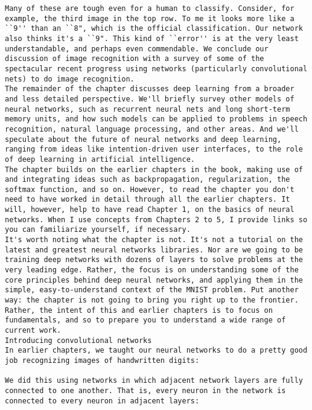 \begin{lstlisting}
Many of these are tough even for a human to classify. Consider, for example, the third image in the top row. To me it looks more like a ``9'' than an ``8", which is the official classification. Our network also thinks it's a ``9". This kind of ``error'' is at the very least understandable, and perhaps even commendable. We conclude our discussion of image recognition with a survey of some of the spectacular recent progress using networks (particularly convolutional nets) to do image recognition.
The remainder of the chapter discusses deep learning from a broader and less detailed perspective. We'll briefly survey other models of neural networks, such as recurrent neural nets and long short-term memory units, and how such models can be applied to problems in speech recognition, natural language processing, and other areas. And we'll speculate about the future of neural networks and deep learning, ranging from ideas like intention-driven user interfaces, to the role of deep learning in artificial intelligence.
The chapter builds on the earlier chapters in the book, making use of and integrating ideas such as backpropagation, regularization, the softmax function, and so on. However, to read the chapter you don't need to have worked in detail through all the earlier chapters. It will, however, help to have read Chapter 1, on the basics of neural networks. When I use concepts from Chapters 2 to 5, I provide links so you can familiarize yourself, if necessary.
It's worth noting what the chapter is not. It's not a tutorial on the latest and greatest neural networks libraries. Nor are we going to be training deep networks with dozens of layers to solve problems at the very leading edge. Rather, the focus is on understanding some of the core principles behind deep neural networks, and applying them in the simple, easy-to-understand context of the MNIST problem. Put another way: the chapter is not going to bring you right up to the frontier. Rather, the intent of this and earlier chapters is to focus on fundamentals, and so to prepare you to understand a wide range of current work.
Introducing convolutional networks
In earlier chapters, we taught our neural networks to do a pretty good job recognizing images of handwritten digits:

We did this using networks in which adjacent network layers are fully connected to one another. That is, every neuron in the network is connected to every neuron in adjacent layers:


\end{lstlisting}
